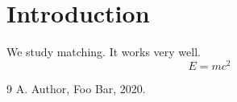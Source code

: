 \documentclass{article}
\begin{document}
\section{Introduction}
We study matching. It works very well.
\begin{equation} E = mc^2 \end{equation}
\begin{thebibliography}{9}
 A. Author, Foo Bar, 2020.
\end{thebibliography}
\end{document}

